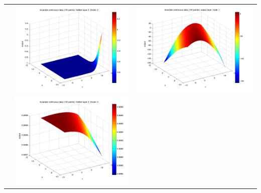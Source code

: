\documentclass[fleqn]{article}
\begin{document}
\begin{center}
\begin{longtable}{ c | c | r }
     																		&   \includegraphics[scale=0.25]{./pics/bivariate100/_2_4/_2_4_epoch_Inf_hidden layer 2 :22}  & \includegraphics[scale=0.25]{./pics/bivariate100/_2_4/_2_4_epoch_Inf_output layer :1}  \\ 
     																		&   \includegraphics[scale=0.25]{./pics/bivariate100/_2_4/_2_4_epoch_Inf_hidden layer 2 :23} &  \\

\end{longtable}
\end{center}
\end{document}
